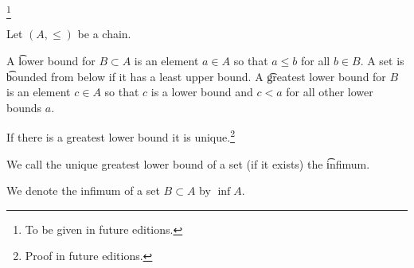 
\footnote{To be given in future editions.}


Let $(A, \leq)$ be a chain.

A \t{lower bound} for $B \subset A$ is an element $a \in A$ so that $a \leq b$ for all $b \in B$.
A set is \t{bounded from below} if it has a least upper bound.
A \t{greatest lower bound} for $B$ is an element $c \in A$ so that $c$ is a lower bound and $c < a$ for all other lower bounds $a$.

\begin{proposition}
  If there is a greatest lower bound it is unique.\footnote{Proof in future editions.}
\end{proposition}

We call the unique greatest lower bound of a set (if it exists) the \t{infimum}.


We denote the infimum of a set $B \subset A$ by $\inf A$.

\blankpage
